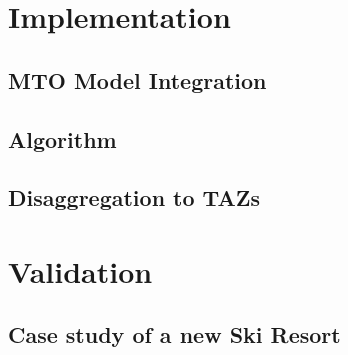\chapter{Implementation}

\section{MTO Model Integration}

\section{Algorithm}

\section{Disaggregation to TAZs}


\chapter{Validation}

\section{Case study of a new Ski Resort}